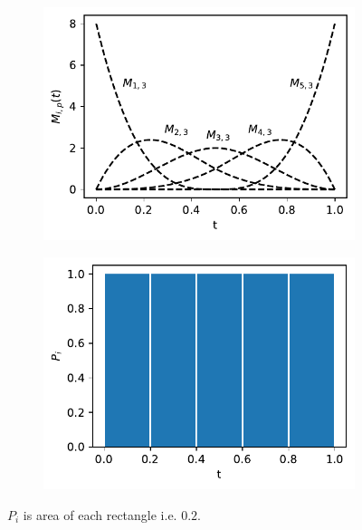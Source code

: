 \documentclass[../Thesis.tex]{subfiles}
\begin{document}
\begin{figure}[h]
    \centering
    \begin{subfigure}[t]{0.49\textwidth}
        \centering
        \includegraphics[width=\linewidth]{figures/MI estimation/M-spline basis functions - degree 3.pdf}
        \caption{}
        \label{subfig:M-spline functions}
    \end{subfigure}
    \hfill
    \begin{subfigure}[t]{0.49\textwidth}
        \centering
        \includegraphics[width=\linewidth]{figures/MI estimation/M-spline marginal dist - degree 3.pdf}
        \caption{}
    \end{subfigure}
    \caption{$P_i$ is area of each rectangle i.e. $0.2$.}
    \label{fig:M-splines}
\end{figure}
\end{document}
